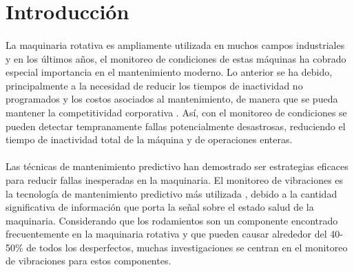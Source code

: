 \documentclass[12pt]{article}
\begin{document}
\newpage
\renewcommand{\contentsname}{Índice}
\renewcommand{\tablename}{Tabla} 
\tableofcontents
\renewcommand{\figurename}{Figura}
\renewcommand{\refname}{Referencias}
\renewcommand{\listtablename}{Lista de Tablas}
\newpage



\renewcommand{\listfigurename}{Lista de Figuras}
\listoffigures
\listoftables
\newpage


\section{Introducción}

\paragraph{}
La maquinaria rotativa es ampliamente utilizada en muchos campos industriales y en los últimos años, el monitoreo de condiciones de estas máquinas ha cobrado especial importancia en el mantenimiento moderno. Lo anterior se ha debido, principalmente a la necesidad de reducir los tiempos de inactividad no programados y los costos asociados al mantenimiento, de manera que se pueda mantener la competitividad corporativa \cite{seeraa}. Así, con el monitoreo de condiciones se pueden detectar tempranamente fallas potencialmente desastrosas, reduciendo el tiempo de inactividad total de la máquina y de operaciones enteras.

\paragraph{}
Las técnicas de mantenimiento predictivo han demostrado ser estrategias eficaces para reducir fallas inesperadas en la maquinaria. El monitoreo de vibraciones es la tecnología de mantenimiento predictivo más utilizada \cite{zhan}, debido a la cantidad significativa de información que porta la señal sobre el estado salud de la maquinaria. Considerando que los rodamientos son un componente encontrado frecuentemente en la maquinaria rotativa y que pueden causar alrededor del 40-50\% \cite{issam} de todos los desperfectos, muchas investigaciones se centran en el monitoreo de vibraciones para estos componentes.
\end{document}
